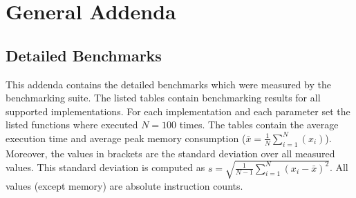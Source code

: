 \chapter{General Addenda}

\section{Detailed Benchmarks}
\label{app:detailed_benchmarks}
This addenda contains the detailed benchmarks which were measured by the benchmarking suite. The listed tables contain benchmarking results for all supported implementations. For each implementation and each parameter set the listed functions where executed $N=100$ times. The tables contain the average execution time and average peak memory consumption ($\bar{x}=\frac{1}{N}\sum_{i=1}^N{(x_i)}$). Moreover, the values in brackets are the standard deviation over all measured values. This standard deviation is computed as $s=\sqrt{\frac{1}{N-1}\sum_{i=1}^N(x_i-\bar{x})^2}$. All values (except memory)  are absolute instruction counts.\newpage

